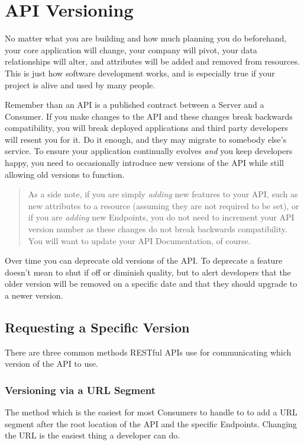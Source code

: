 \documentclass{book}
\begin{document}
\section{API Versioning}

No matter what you are building and how much planning you do beforehand, your core application will change, your company will pivot, your data relationships will alter, and attributes will be added and removed from resources. This is just how software development works, and is especially true if your project is alive and used by many people.

Remember than an API is a published contract between a Server and a Consumer. If you make changes to the API and these changes break backwards compatibility, you will break deployed applications and third party developers will resent you for it. Do it enough, and they may migrate to somebody else's service. To ensure your application continually evolves \emph{and} you keep developers happy, you need to occasionally introduce new versions of the API while still allowing old versions to function.

\begin{quote}
As a side note, if you are simply \emph{adding} new features to your API, such as new attributes to a resource (assuming they are not required to be set), or if you are \emph{adding} new Endpoints, you do not need to increment your API version number as these changes do not break backwards compatibility. You will want to update your API Documentation, of course.
\end{quote}

Over time you can deprecate old versions of the API. To deprecate a feature doesn't mean to shut if off or diminish quality, but to alert developers that the older version will be removed on a specific date and that they should upgrade to a newer version.

\subsection{Requesting a Specific Version}

There are three common methods RESTful APIs use for communicating which version of the API to use.

\subsubsection{Versioning via a URL Segment}

The method which is the easiest for most Consumers to handle to to add a URL segment after the root location of the API and the specific Endpoints. Changing the URL is the easiest thing a developer can do.
\end{document}
